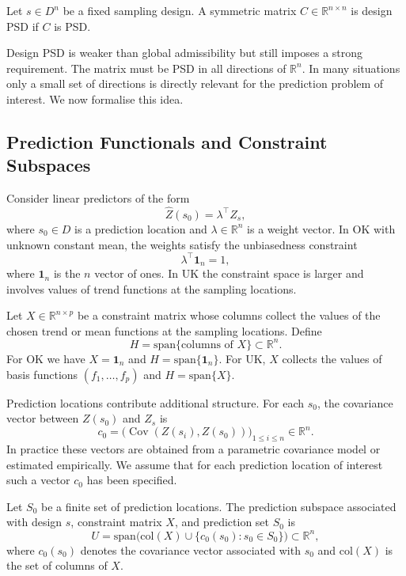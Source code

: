 \documentclass[smallextended]{svjour3}
\newcommand{\R}{\mathbb{R}}
\newcommand{\T}{\top}
\newcommand{\1}{\mathbf{1}}
\DeclareMathOperator{\Cov}{Cov}
\begin{document}
\begin{definition}
	Let $s \in D^n$ be a fixed sampling design. A symmetric matrix
	 $C \in \R^{n \times n}$ is design PSD if $C$ is PSD.
\end{definition}

Design PSD is weaker than global admissibility but still imposes a strong requirement. The matrix must be PSD in all directions of $\R^n$. In many situations only a small set of directions is directly relevant for the prediction problem of interest. We now formalise this idea.

\subsection{Prediction Functionals and Constraint Subspaces}

Consider linear predictors of the form
\[
\hat{Z}(s_0) = \lambda^{\T} Z_s,
\]
where $s_0 \in D$ is a prediction location and $\lambda \in \R^n$ is a weight vector. In OK with unknown constant mean, the weights satisfy the unbiasedness constraint
\[
\lambda^{\T} \mathbf{1}_n = 1,
\]
where $\mathbf{1}_n$ is the $n$ vector of ones. In UK the constraint space is larger and involves values of trend functions at the sampling locations.

Let $X \in \R^{n \times p}$ be a constraint matrix whose columns collect the values of the chosen trend or mean functions at the sampling locations. Define
\[
H = \mathrm{span}\{\text{columns of } X\} \subset \R^n.
\]
For OK we have $X = \mathbf{1}_n$ and $H = \mathrm{span}\{\mathbf{1}_n\}$. For UK, $X$ collects the values of basis functions $(f_1,\dots,f_p)$ and $H = \mathrm{span}\{X\}$.

Prediction locations contribute additional structure. For each $s_0$, the covariance vector between $Z(s_0)$ and $Z_s$ is
\[
c_0 = \bigl(\Cov(Z(s_i),Z(s_0))\bigr)_{1 \leq i \leq n} \in \R^n.
\]
In practice these vectors are obtained from a parametric covariance model or estimated empirically. We assume that for each prediction location of interest such a vector $c_0$ has been specified.

\begin{definition}
	Let $S_0$ be a finite set of prediction locations. The prediction subspace associated with design $s$, constraint matrix $X$, and prediction set $S_0$ is
	\[
	U = \mathrm{span}\bigl( \mathrm{col}(X) \cup \{ c_0(s_0) : s_0 \in S_0 \} \bigr) \subset \R^n,
	\]
	where $c_0(s_0)$ denotes the covariance vector associated with $s_0$ and $\mathrm{col}(X)$ is the set of columns of $X$.
\end{definition}
\end{document}
